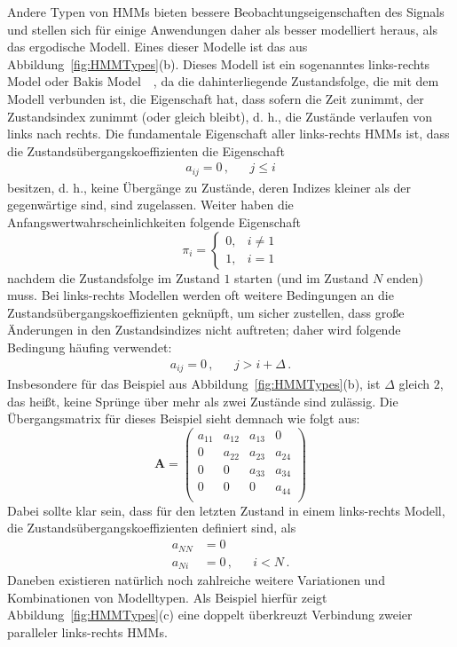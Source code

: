 Andere Typen von \acrshort{HMM}s bieten bessere Beobachtungseigenschaften des Signals und stellen sich f\"ur einige Anwendungen daher als besser modelliert heraus, als das ergodische Modell. Eines dieser Modelle ist das aus  Abbildung~\ref{fig:HMMTypes}(b). Dieses Modell ist ein sogenanntes links-rechts Model oder Bakis Model~\cite{bib:jelinek}~\cite{bib:baki}, da die dahinterliegende Zustandsfolge, die mit dem Modell verbunden ist, die Eigenschaft hat, dass sofern die Zeit zunimmt, der Zustandsindex zunimmt (oder gleich bleibt), d. h., die Zust\"ande verlaufen von links nach rechts. Die fundamentale Eigenschaft aller links-rechts HMMs ist, dass die Zustands\"ubergangskoeffizienten die Eigenschaft
\begin{align}
a_{ij} = 0 \, , & & j \leq i
\end{align}
besitzen, d. h., keine \"Uberg\"ange zu Zust\"ande, deren Indizes kleiner als der gegenw\"artige sind, sind zugelassen. Weiter haben die Anfangswertwahrscheinlichkeiten folgende Eigenschaft
\[
\pi_i = 
\begin{cases}
	0, & i \ne 1 \\
	1, & i = 1
\end{cases}
\]
nachdem die Zustandsfolge im Zustand $1$ starten (und im Zustand $N$ enden) muss. Bei links-rechts Modellen werden oft weitere Bedingungen an die Zustands\"ubergangskoeffizienten gekn\"upft, um sicher zustellen, dass gro\ss e \"Anderungen in den Zustandsindizes nicht auftreten; daher wird folgende Bedingung h\"aufing verwendet:
\begin{align}
a_{ij} = 0 \, , & & j > i + \varDelta \, .
\end{align}
Insbesondere f\"ur das Beispiel aus Abbildung~\ref{fig:HMMTypes}(b), ist $\varDelta$ gleich $2$, das hei\ss t, keine Spr\"unge \"uber mehr als zwei Zust\"ande sind zul\"assig. Die \"Ubergangsmatrix f\"ur dieses Beispiel sieht demnach wie folgt aus:
\begin{equation}
\mathbf{A} = 
\begin{pmatrix}
a_{11} & a_{12} & a_{13} &0 \\
0 & a_{22} & a_{23} & a_{24} \\
0 & 0 & a_{33} & a_{34} \\
0 & 0 & 0 & a_{44} \\
\end{pmatrix}
\end{equation}
Dabei sollte klar sein, dass f\"ur den letzten Zustand in einem links-rechts Modell, die Zustands\"ubergangskoeffizienten definiert sind, als
\begin{subequations}
\begin{align}
\label{E:TransitionProperties}
a_{NN} &= 0  \\
a_{Ni} &= 0 \, , & & i < N \, . 
\end{align}
\end{subequations}
Daneben existieren nat\"urlich noch zahlreiche weitere Variationen und Kombinationen von Modelltypen. Als Beispiel hierf\"ur zeigt Abbildung~\ref{fig:HMMTypes}(c) eine doppelt \"uberkreuzt Verbindung zweier paralleler links-rechts HMMs.